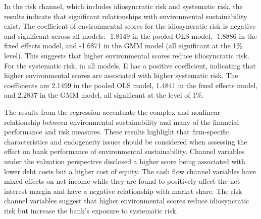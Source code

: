 \documentclass[11pt, a4paper]{article}
\begin{document}
In the risk channel, which includes idiosyncratic risk and systematic risk, the results indicate that significant relationships with environmental sustainability exist. The coefficient of environmental scores for the idiosyncratic risk is negative and significant across all models: -1.8149 in the pooled OLS model, -1.8886 in the fixed effects model, and -1.6871 in the GMM model (all significant at the 1\% level). This suggests that higher environmental scores reduce idiosyncratic risk. For the systematic risk, in all models, E has a positive coefficient, indicating that higher environmental scores are associated with higher systematic risk. The coefficients are 2.1499 in the pooled OLS model, 1.4841 in the fixed effects model, and 2.2837 in the GMM model, all significant at the level of 1\%.

The results from the regression accentuate the complex and nonlinear relationship between environmental sustainability and many of the financial performance and risk measures. These results highlight that firm-specific characteristics and endogeneity issues should be considered when assessing the effect on bank performance of environmental sustainability. Channel variables under the valuation perspective disclosed a higher score being associated with lower debt costs but a higher cost of equity. The cash flow channel variables have mixed effects on net income while they are found to positively affect the net interest margin and have a negative relationship with market share. The risk channel variables suggest that higher environmental scores reduce idiosyncratic risk but increase the bank's exposure to systematic risk.
\end{document}
